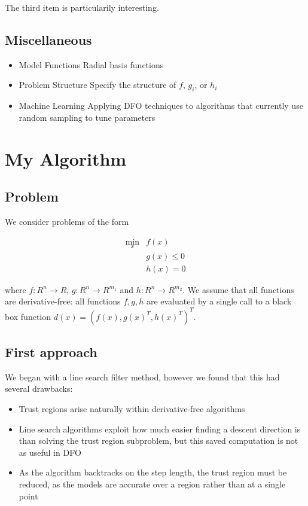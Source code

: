 \documentclass{article}
\begin{document}
The third item is particularily interesting.






\subsection{Miscellaneous}

\begin{itemize}
\item Model Functions
	Radial basis functions
\item Problem Structure
	Specify the structure of $f$, $g_i$, or $h_i$
\item Machine Learning
	Applying DFO techniques to algorithms that currently use random sampling to tune parameters
\end{itemize}








\section{My Algorithm}

\subsection{Problem}

We consider problems of the form

\begin{align*}
\min_x & f(x) \\
 & g(x) \le 0 \\
 & h(x) = 0
\end{align*}

where $f : R^n \to R$, $g : R^{n} \to R^{m_1}$ and $h : R^{n} \to R^{m_2}$.
We assume that all functions are derivative-free: all functions $f,g,h$ are evaluated by a single call to a black box function $d(x) = (f(x), g(x)^T, h(x)^T)^T$.



\subsection{First approach}
We began with a line search filter method, however we found that this had several drawbacks:

\begin{itemize}
\item Trust regions arise naturally within derivative-free algorithms
\item Line search algorithms exploit how much easier finding a descent direction is than solving the trust region subproblem, but this saved computation is not as useful in DFO
\item As the algorithm backtracks on the step length, the trust region must be reduced, as the models are accurate over a region rather than at a single point
\end{itemize}
\end{document}
